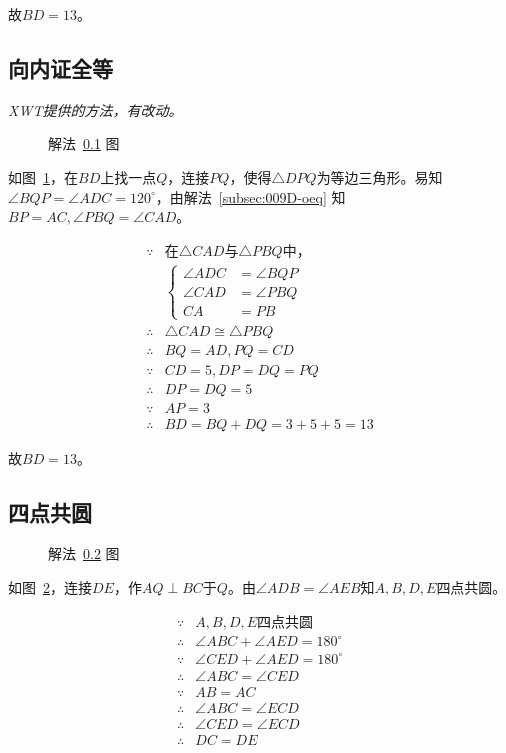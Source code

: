故$BD = 13$。

\subsection{向内证全等} \label{subsec:009D-ieq}

\textit{XWT提供的方法，有改动。}

\begin{figure}[htbp]
  \centering
  \caption{解法~\ref{subsec:009D-ieq} 图} \label{fig:009D-ieq}
\end{figure}

如图~\ref{fig:009D-ieq}，在$BD$上找一点$Q$，连接$PQ$，使得$\triangle DPQ$为等边三角形。易知$\angle BQP = \angle ADC = 120^\circ$，由解法~\ref{subsec:009D-oeq} 知$BP = AC, \angle PBQ = \angle CAD$。

\begin{align*}
  \because  {}& \text{在$\triangle CAD$与$\triangle PBQ$中，} \\
  & \left\{ \begin{aligned}
    \angle ADC &= \angle BQP \\
    \angle CAD &= \angle PBQ \\
    CA &= PB
  \end{aligned} \right. \\
  \therefore{}& \triangle CAD \cong \triangle PBQ \\
  \therefore{}& BQ = AD, PQ = CD \\
  \because  {}& CD = 5, DP = DQ = PQ \\
  \therefore{}& DP = DQ = 5 \\
  \because  {}& AP = 3 \\
  \therefore{}& BD = BQ + DQ = 3 + 5 + 5 = 13
\end{align*}

故$BD = 13$。

\subsection{四点共圆} \label{subsec:009D-circ}

\begin{figure}[htbp]
  \centering
  \caption{解法~\ref{subsec:009D-circ} 图} \label{fig:009D-circ}
\end{figure}

如图~\ref{fig:009D-circ}，连接$DE$，作$AQ \perp BC$于$Q$。由$\angle ADB = \angle AEB$知$A, B, D, E$四点共圆。

\begin{align*}
  \because  {}& \text{$A, B, D, E$四点共圆} \\
  \therefore{}& \angle ABC + \angle AED = 180^\circ \\
  \because  {}& \angle CED + \angle AED = 180^\circ \\
  \therefore{}& \angle ABC = \angle CED \\
  \because  {}& AB = AC \\
  \therefore{}& \angle ABC = \angle ECD \\
  \therefore{}& \angle CED = \angle ECD \\
  \therefore{}& DC = DE
\end{align*}

